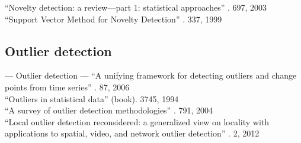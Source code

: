 ``Novelty detection: a review—part 1: statistical approaches'' \cite{markou2003novelty}. 697, 2003 \\

``Support Vector Method for Novelty Detection'' \cite{scholkopf1999support}. 337, 1999 \\

\subsection{Outlier detection}\label{subsec:outlier_detection}

--- Outlier detection ---
``A unifying framework for detecting outliers and change points from time series'' \cite{takeuchi2006unifying}. 87, 2006 \\

``Outliers in statistical data'' \cite{barnett1994outliers} (book). 3745, 1994 \\

``A survey of outlier detection methodologies'' \cite{hodge2004survey}. 791, 2004 \\

``Local outlier detection reconsidered: a generalized view on locality with applications to spatial, video, and network outlier detection'' \cite{schubert2012local}. 2, 2012 \\








